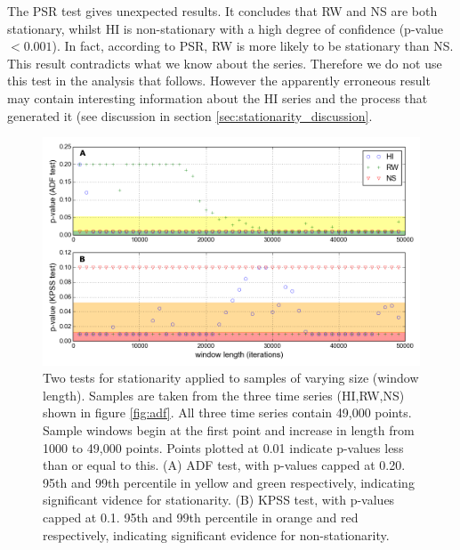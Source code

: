 The PSR test gives unexpected results. It concludes that RW and NS are both stationary, whilst HI is non-stationary with a high degree of confidence (p-value$<0.001$). In fact, according to PSR, RW is more likely to be stationary than NS. This result contradicts what we know about the series. Therefore we do not use this test in the analysis that follows. However the apparently erroneous result may contain interesting information about the HI series and the process that generated it (see discussion in section \ref{sec:stationarity_discussion}. 




\begin{figure}[h!]
	\centering
	\includegraphics[width=0.80\linewidth]{"./chapters/chapter04b/figures/Rtests/stat_tests_v_wl"}
     \caption{Two tests for stationarity applied to samples of varying size (window length). Samples are taken from the three time series (HI,RW,NS) shown in figure \ref{fig:adf}. All three time series contain 49,000 points. Sample windows begin at the first point and increase in length from 1000 to 49,000 points. Points plotted at 0.01 indicate p-values less than or equal to this. (A) ADF test, with p-values capped at 0.20. 95th and 99th percentile in yellow and green respectively, indicating significant vidence for stationarity. (B) KPSS test, with p-values capped at 0.1. 95th and 99th percentile in orange and red respectively, indicating significant evidence for non-stationarity.} 
     \label{fig:stat_tests_v_wl}   
\end{figure}

